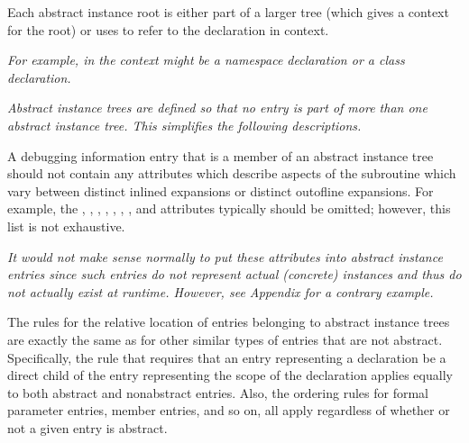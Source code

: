 Each abstract instance root is either part of a larger
tree (which gives a context for the root) or 
uses
to refer to the declaration in context.

\textit{For example, in  the context might be a namespace
declaration or a class declaration.}

\textit{Abstract instance trees are defined so that no entry is part
of more than one abstract instance tree. This simplifies the
following descriptions.}

A debugging information entry that is a member of an abstract
instance tree should not contain any attributes which describe
aspects of the subroutine which vary between distinct inlined
expansions or distinct out\dash of\dash line expansions. For example,
the ,
, 
, 
, 
,
, 
, 
and 
attributes 
typically 
should 
be 
omitted; 
however, 
this 
list
is not exhaustive.

\textit{It would not make sense normally to put these attributes into
abstract instance entries since such entries do not represent
actual (concrete) instances and thus do not actually exist at
run\dash time.  However, 
see Appendix  
for a contrary example.}

The rules for the relative location of entries belonging to
abstract instance trees are exactly the same as for other
similar types of entries that are not abstract. Specifically,
the rule that requires that an entry representing a declaration
be a direct child of the entry representing the scope of the
declaration applies equally to both abstract and non\dash abstract
entries. Also, the ordering rules for formal parameter entries,
member entries, and so on, all apply regardless of whether
or not a given entry is abstract.

